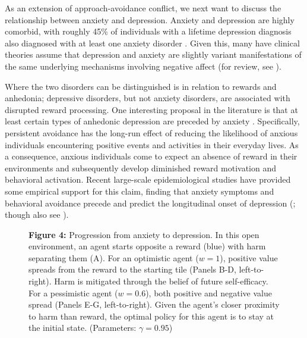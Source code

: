 \documentclass[11pt]{article} %
\begin{document}
As an extension of approach-avoidance conflict, we next want to discuss the relationship between anxiety and depression. Anxiety and depression are highly comorbid, with roughly 45\% of individuals with a lifetime depression diagnosis also diagnosed with at least one anxiety disorder \citep{kessler2015}. Given this, many have clinical theories assume that depression and anxiety are slightly variant manifestations of the same underlying mechanisms involving negative affect (for review, see \cite{jacobson2014}).

Where the two disorders can be distinguished is in relation to rewards and anhedonia; depressive disorders, but not anxiety disorders, are associated with disrupted reward processing. One interesting proposal in the literature is that at least certain types of anhedonic depression are preceded by anxiety \citep{alloy1990, moitra2008, jacobson2014}. Specifically, persistent avoidance has the long-run effect of reducing the likelihood of anxious individuals encountering positive events and activities in their everyday lives. As a consequence, anxious individuals come to expect an absence of reward in their environments and subsequently develop diminished reward motivation and behavioral activation. Recent large-scale epidemiological studies have provided  some empirical support for this claim, finding that anxiety symptoms and behavioral avoidance precede and predict the longitudinal onset of depression (\cite{mathew2011, jacobson2014, kessler2015}; though also see \cite{jacobson2017, plana2019}).

\begin{figure}
  \centerline{%
  }
  \par \textbf{Figure 4:} Progression from anxiety to depression. In this open environment, an agent starts opposite a reward (blue) with harm separating them (A). For an optimistic agent ($w=1$), positive value spreads from the reward to the starting tile (Panels B-D, left-to-right). Harm is mitigated through the belief of future self-efficacy. For a pessimistic agent ($w=0.6$), both positive and negative value spread (Panels E-G, left-to-right). Given the agent's closer proximity to harm than reward, the optimal policy for this agent is to stay at the initial state. (Parameters: $\gamma = 0.95$)
\end{figure}
\end{document}
